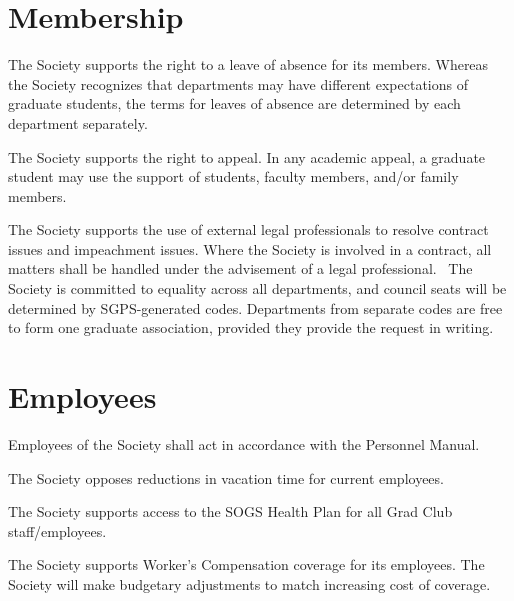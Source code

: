 \section{Membership}
\begin{longenum}[ label*=\thesection.\arabic*., align=left]
\item The Society supports the right to a leave of absence for its members. Whereas the Society recognizes that departments may have different expectations of graduate students, the terms for leaves of absence are determined by each department separately.
\item The Society supports the right to appeal. In any academic appeal, a graduate student may use the support of students, faculty members, and/or family members.
\item The Society supports the use of external legal professionals to resolve contract issues and impeachment issues. Where the Society is involved in a contract, all matters shall be handled under the advisement of a legal professional.
\ The Society is committed to equality across all departments, and council seats will be determined by SGPS-generated codes. Departments from separate codes are free to form one graduate association, provided they provide the request in writing.
\end{longenum}

\section{Employees}
\begin{longenum}[ label*=\thesection.\arabic*., align=left]
\item Employees of the Society shall act in accordance with the Personnel Manual.
\item The Society opposes reductions in vacation time for current employees.
\item The Society supports access to the SOGS Health Plan for all Grad Club staff/employees.
\item The Society supports Worker’s Compensation coverage for its employees. The Society will make budgetary adjustments to match increasing cost of coverage.
\end{longenum}

